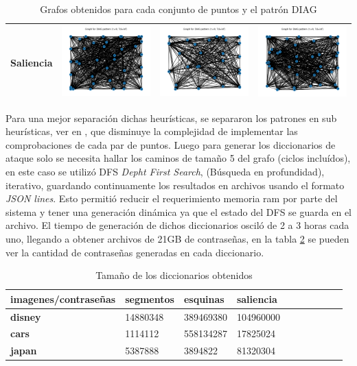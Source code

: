 \begin{table}[H]
\begin{tabular}{|c|c|c|c|}
		Saliencia & \includegraphics[width=3.5cm]{Graphics/disney-saliency-graph.png} 
		& \includegraphics[width=3.5cm]{Graphics/cars-saliency-graph.png} 
		& \includegraphics[width=3.5cm]{Graphics/japan-saliency-graph.png} \\ \hline
	\end{tabular}
	\caption{Grafos obtenidos para cada conjunto de puntos y el patr\'on DIAG}
	\label{graphs}
\end{table}


Para una mejor separaci\'on dichas heur\'isticas, se separaron los patrones en sub heur\'isticas, ver en \cite{van2010purely}, que disminuye la complejidad de implementar las comprobaciones de cada par de puntos. Luego para generar los diccionarios de ataque solo se necesita hallar los caminos de tama\~no 5 del grafo (ciclos inclu\'idos), en este caso se utiliz\'o DFS \textit{Depht First Search}, (B\'usqueda en profundidad), iterativo, guardando continuamente los resultados en archivos usando el formato \textit{JSON lines}. Esto permiti\'o reducir el requerimiento memoria ram por parte del sistema y tener una generaci\'on  din\'amica ya que el estado del DFS se guarda en el archivo. El tiempo de generaci\'on de dichos diccionarios oscil\'o de 2 a 3 horas cada uno, llegando a obtener archivos de 21GB de contrase\~nas, en la tabla \ref{dictionary:lengths} se pueden ver la cantidad de contrase\~nas generadas en cada diccionario.  

\begin{table}[H]
	\centering
	\caption{Tama\~no de los diccionarios obtenidos}
	\label{dictionary:lengths}
	\begin{tabular}{|l|l|l|l|l|l|l|l|l|l|}
		\hline
		\textbf{imagenes/contrase\~nas} & \textbf{segmentos} & \textbf{esquinas} & \textbf{saliencia }  \\ \hline
		\textbf{disney} & 14880348 & 389469380 & 104960000  \\ \hline
		\textbf{cars} & 1114112 & 558134287 & 17825024  \\ \hline
		\textbf{japan} & 5387888 & 3894822 & 81320304 \\ \hline
	\end{tabular}
\end{table}



